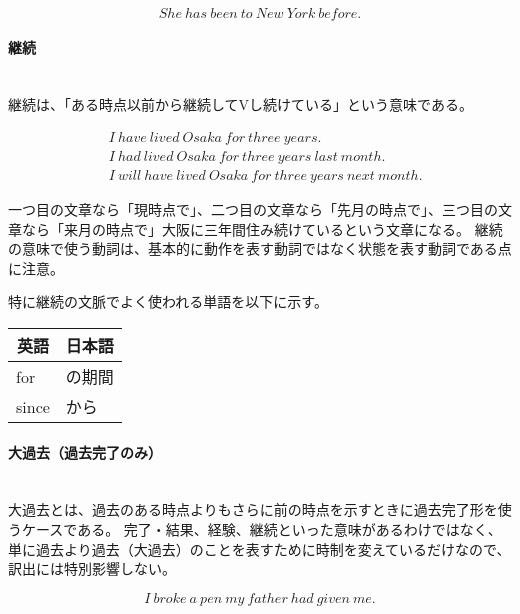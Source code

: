 \begin{equation}
  She ~ has ~ been ~ to ~ New ~ York ~ before \text{.}
\end{equation}

\paragraph{継続}\quad\\

継続は、「ある時点以前から継続してVし続けている」という意味である。

\begin{align}
  &I ~ have ~ lived ~ Osaka ~ for ~ three ~ years \text{.}\\
  &I ~ had ~ lived ~ Osaka ~ for ~ three ~ years ~ last ~ month \text{.}\\
  &I ~ will ~ have ~ lived ~ Osaka ~ for ~ three ~ years ~ next ~ month \text{.}
\end{align}

一つ目の文章なら「現時点で」、二つ目の文章なら「先月の時点で」、三つ目の文章なら「来月の時点で」大阪に三年間住み続けているという文章になる。
継続の意味で使う動詞は、基本的に動作を表す動詞ではなく状態を表す動詞である点に注意。

特に継続の文脈でよく使われる単語を以下に示す。

\begin{table}[H]
  \centering
  \begin{tabular}{ll}
    \hline
    \multicolumn{1}{c}{英語} & \multicolumn{1}{c}{日本語}\\
    \hline \hline
    for & の期間 \\
    since & から \\
    \hline
  \end{tabular}
\end{table}

\paragraph{大過去（過去完了のみ）}\quad\\

大過去とは、過去のある時点よりもさらに前の時点を示すときに過去完了形を使うケースである。
完了・結果、経験、継続といった意味があるわけではなく、単に過去より過去（大過去）のことを表すために時制を変えているだけなので、訳出には特別影響しない。

\begin{equation}
  I ~ broke ~ a ~ pen ~ my ~ father ~ had ~ given ~ me \text{.}
\end{equation}

